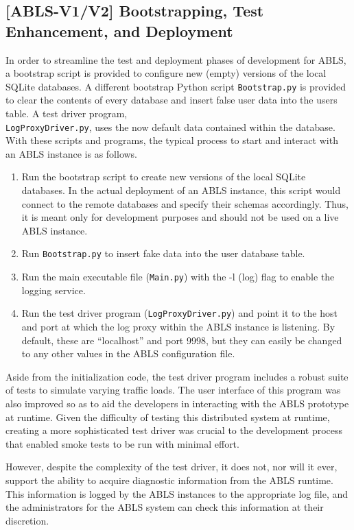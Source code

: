 \documentclass{sig-alternate}
\begin{document}
\subsection{[ABLS-V1/V2] Bootstrapping, Test Enhancement, and Deployment}
In order to streamline the test and deployment phases of development for ABLS, a bootstrap script is provided to configure
new (empty) versions of the local SQLite databases. A different bootstrap Python script {\tt Bootstrap.py} is provided 
to clear the contents of every database and insert false user data into the users table. 
A test driver program, \\{\tt LogProxyDriver.py}, uses the now default data contained within the 
database. With these scripts and programs, the typical process to start and interact with an ABLS instance is as follows.

\begin{enumerate}
	\item Run the bootstrap script to create new versions of the local SQLite databases. In the actual deployment of an ABLS instance, this script would connect to the remote databases and specify their schemas accordingly. Thus, it is meant only for development purposes and should not be used on a live ABLS instance.
	\item Run {\tt Bootstrap.py} to insert fake data into the user database table.
	\item Run the main executable file ({\tt Main.py}) with the -l (log) flag to enable the logging service.	
	\item Run the test driver program ({\tt LogProxyDriver.py}) and point it to the host and port at which the log proxy within the ABLS instance is listening. By default, these are ``localhost'' and port 9998, but they can easily be changed to any other values in the ABLS configuration file. 
\end{enumerate}

Aside from the initialization code, the test driver program includes a robust suite of tests to simulate varying traffic 
loads. The user interface of this program was also improved so as to aid the developers in interacting with the ABLS 
prototype at runtime. Given the difficulty of testing this distributed system at runtime, creating a more sophisticated
test driver was crucial to the development process that enabled smoke tests to be run with minimal effort.

However, despite the complexity of the test driver, it does not, nor will it ever, support the ability to acquire 
diagnostic information from the ABLS runtime. This information is logged by the ABLS instances to the appropriate log 
file, and the administrators for the ABLS system can check this information at their discretion.
\end{document}
